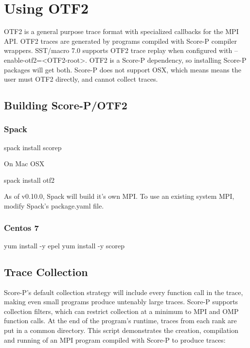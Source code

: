 
\section{Using OTF2}
\label{sec:tutorial:otf}
OTF2 is a general purpose trace format with specialized callbacks for the MPI API. OTF2 traces are generated by programs compiled with Score-P compiler wrappers. SST/macro 7.0 supports OTF2 trace replay when configured with --enable-otf2=<OTF2-root>. OTF2 is a Score-P dependency, so installing Score-P packages will get both. Score-P does not support OSX, which means means the user must OTF2 directly, and cannot collect traces.
\subsection{Building Score-P/OTF2}
\label{subset:otf:build}
\subsubsection{Spack}
\begin{ViFile}
spack install scorep
\end{ViFile}
On Mac OSX
\begin{ViFile}
spack install otf2
\end{ViFile}
As of v0.10.0, Spack will build it's own MPI. To use an existing system MPI, modify Spack's package.yaml file.
\subsubsection{Centos 7}
\begin{ViFile}
yum install -y epel
yum install	-y scorep
\end{ViFile}


\subsection{Trace Collection}
\label{subsec:otf:traceCollection}
Score-P's default collection strategy will include every function call in the trace, making even small programs produce untenably large traces. Score-P supports collection filters, which can restrict collection at a minimum to MPI and OMP function calls. At the end of the program's runtime, traces from each rank are put in a common directory. This script demonstrates the creation, compilation and running of an MPI program compiled with Score-P to produce traces:

